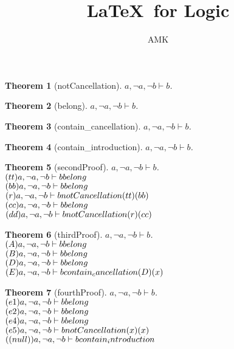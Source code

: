 \documentclass[11pt]{article}
\title{\textbf{\LaTeX\ for Logic}}
\author{AMK}
\newtheorem{theorem}{Theorem}
\def\turn{\vdash}
\begin{document}
\maketitle
\begin{theorem}[notCancellation] $ a, \neg a, \neg b \turn b $.\\
\end{theorem}
\begin{theorem}[belong] $ a, \neg a, \neg b \turn b $.\\
\end{theorem}
\begin{theorem}[contain_cancellation] $ a, \neg a, \neg b \turn b $.\\
\end{theorem}
\begin{theorem}[contain_introduction] $ a, \neg a, \neg b \turn b $.\\
\end{theorem}
\begin{theorem}[secondProof] $ a, \neg a, \neg b \turn b $.\\
$(tt)a, \neg a, \neg b \turn b \hfill belong  $\\
$(bb)a, \neg a, \neg b \turn b \hfill belong  $\\
$(r)a, \neg a, \neg b \turn b \hfill notCancellation (tt)(bb) $\\
$(cc)a, \neg a, \neg b \turn b \hfill belong  $\\
$(dd)a, \neg a, \neg b \turn b \hfill notCancellation (r)(cc) $\\
\end{theorem}
\begin{theorem}[thirdProof] $ a, \neg a, \neg b \turn b $.\\
$(A)a, \neg a, \neg b \turn b \hfill belong  $\\
$(B)a, \neg a, \neg b \turn b \hfill belong  $\\
$(D)a, \neg a, \neg b \turn b \hfill belong  $\\
$(E)a, \neg a, \neg b \turn b \hfill contain_cancellation (D)(x) $\\
\end{theorem}
\begin{theorem}[fourthProof] $ a, \neg a, \neg b \turn b $.\\
$(e1)a, \neg a, \neg b \turn b \hfill belong  $\\
$(e2)a, \neg a, \neg b \turn b \hfill belong  $\\
$(e4)a, \neg a, \neg b \turn b \hfill belong  $\\
$(e5)a, \neg a, \neg b \turn b \hfill notCancellation (x)(x) $\\
$((null))a, \neg a, \neg b \turn b \hfill contain_introduction  $\\
\end{theorem}
\end{document}
